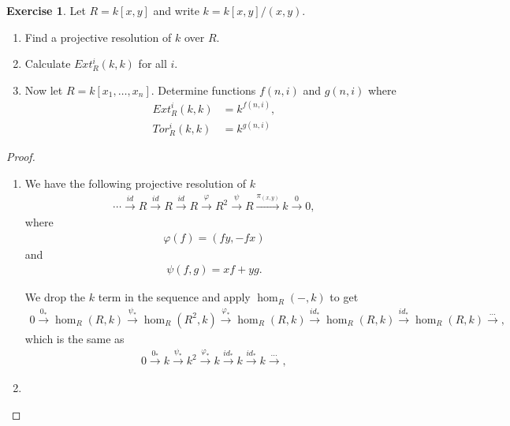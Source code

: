 \documentclass[12pt]{extarticle}
\newcommand{\<}{\langle}
\renewcommand{\>}{\rangle}
\theoremstyle{definition}
\newtheorem{exercise}{Exercise}
\begin{document}
\begin{exercise}
  Let $R=k[x,y]$ and write $k = k[x,y]/(x,y)$.
  \begin{enumerate}
  \item
    Find a projective resolution of $k$ over $R$.
  \item
    Calculate $Ext_{R}^i(k,k)$ for all $i$.
  \item
    Now let $R=k[x_1, \dots, x_n]$. Determine  functions $f(n,i)$ and $g(n,i)$ where
    \begin{align*}
      Ext_R^i(k,k) &= k^{f(n,i)}, \\
      Tor_R^{i}(k,k) &= k^{g(n,i)}
    \end{align*}
  \end{enumerate}
\end{exercise}
\begin{proof}
  \begin{enumerate}
  \item
    We have the following projective resolution of $k$
    \begin{align*}
      \cdots \xrightarrow{id} R \xrightarrow{id} R \xrightarrow{id} R \xrightarrow{\varphi} R^2 \xrightarrow{\psi} R \xrightarrow{\pi_{(x,y)}} k \xrightarrow{0} 0,
    \end{align*}
    where
    \begin{align*}
      \varphi(f) = (fy,-fx)
    \end{align*}
    and
    \begin{align*}
      \psi(f,g) = xf + yg.
    \end{align*}

    We drop the $k$ term in the sequence and apply $\hom_R(-, k)$ to get
    \begin{align*}
      0 \xrightarrow{0_*} \hom_R(R,k) \xrightarrow{\psi_*} \hom_R(R^2,k) \xrightarrow{\varphi_*} \hom_R(R,k) \xrightarrow{id_*} \hom_R(R,k) \xrightarrow{id_*} \hom_R(R,k) \xrightarrow \dots,
    \end{align*}
    which is the same as
    \begin{align*}
      0 \xrightarrow{0_*} k \xrightarrow{\psi_*} k^2 \xrightarrow{\varphi_*} k \xrightarrow{id_*} k \xrightarrow{id_*} k \xrightarrow \dots,
    \end{align*}
  \item
    
  \end{enumerate}
\end{proof}
\end{document}
